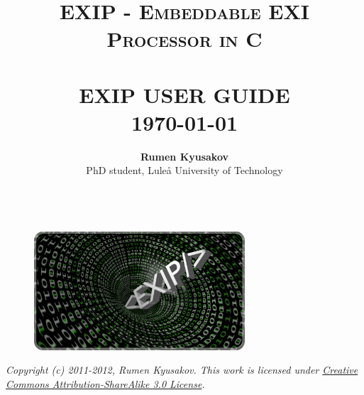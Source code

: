 \documentclass[paper=a4, fontsize=11pt]{scrartcl}	%
\title{	\normalsize \textsc{EXIP - Embeddable EXI Processor in C} 	%
		 	\\[2.0cm]													%
			\HRule{0.5pt} \\										%
			\LARGE \textbf{\uppercase{EXIP User Guide}}	%
			\HRule{2pt} \\ [0.5cm]								%
			\normalsize \today									%
		}
\author{
		\textbf{Rumen Kyusakov}\\	
		PhD student, Lule{\aa} University of Technology\\ [0.5cm]
		\HRule{0.5pt} \\ [0.5cm]
}
\makeatletter
\numberwithin{equation}{section}															%
\numberwithin{figure}{section}																%
\numberwithin{table}{section}																%
\def\printtitle{%
    {\centering \@title\par}}
\def\printauthor{%
    {\centering \large \@author}}
\makeatother
\begin{document}
\thispagestyle{empty}				%

\printtitle									%
  	\vfill
\begin{figure}[!h]
 \begin{center}
 \includegraphics[width=0.70\textwidth, keepaspectratio=true]{images/logo.pdf} \\ [3.5cm]
\end{center}
\end{figure} 

\printauthor

\textit{Copyright (c) 2011-2012, Rumen Kyusakov. This work is licensed under \href{http://creativecommons.org/licenses/by-sa/3.0/}{Creative Commons Attribution-ShareAlike 3.0 License}.}

\clearpage

\thispagestyle{empty}				%

\tableofcontents

\clearpage

\setcounter{page}{1}

















\end{document}
